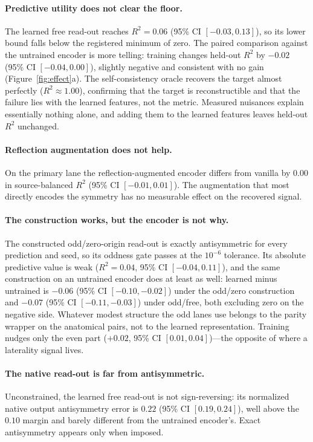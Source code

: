 \documentclass{article}
\begin{document}
\paragraph{Predictive utility does not clear the floor.} The learned free read-out reaches $R^2 = 0.06$ (95\% CI $[-0.03, 0.13]$), so its lower bound falls below the registered minimum of zero. The paired comparison against the untrained encoder is more telling: training changes held-out $R^2$ by $-0.02$ (95\% CI $[-0.04, 0.00]$), slightly negative and consistent with no gain (Figure~\ref{fig:effect}a). The self-consistency oracle recovers the target almost perfectly ($R^2\approx1.00$), confirming that the target is reconstructible and that the failure lies with the learned features, not the metric. Measured nuisances explain essentially nothing alone, and adding them to the learned features leaves held-out $R^2$ unchanged.

\paragraph{Reflection augmentation does not help.} On the primary lane the reflection-augmented encoder differs from vanilla by $0.00$ in source-balanced $R^2$ (95\% CI $[-0.01, 0.01]$). The augmentation that most directly encodes the symmetry has no measurable effect on the recovered signal.

\paragraph{The construction works, but the encoder is not why.} The constructed odd/zero-origin read-out is exactly antisymmetric for every prediction and seed, so its oddness gate passes at the $10^{-6}$ tolerance. Its absolute predictive value is weak ($R^2 = 0.04$, 95\% CI $[-0.04, 0.11]$), and the same construction on an untrained encoder does at least as well: learned minus untrained is $-0.06$ (95\% CI $[-0.10, -0.02]$) under the odd/zero construction and $-0.07$ (95\% CI $[-0.11, -0.03]$) under odd/free, both excluding zero on the negative side. Whatever modest structure the odd lanes use belongs to the parity wrapper on the anatomical pairs, not to the learned representation. Training nudges only the even part ($+0.02$, 95\% CI $[0.01, 0.04]$)---the opposite of where a laterality signal lives.

\paragraph{The native read-out is far from antisymmetric.} Unconstrained, the learned free read-out is not sign-reversing: its normalized native output antisymmetry error is $0.22$ (95\% CI $[0.19, 0.24]$), well above the $0.10$ margin and barely different from the untrained encoder's. Exact antisymmetry appears only when imposed.
\end{document}
